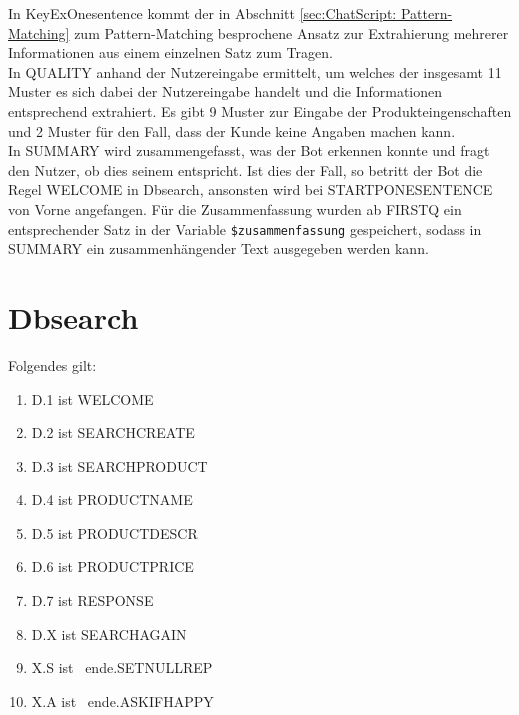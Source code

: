 In KeyExOnesentence kommt der in Abschnitt \ref{sec:ChatScript: Pattern-Matching} zum Pattern-Matching besprochene Ansatz zur Extrahierung mehrerer Informationen aus einem einzelnen Satz zum Tragen.\\
In QUALITY anhand der Nutzereingabe ermittelt, um welches der insgesamt 11 Muster es sich dabei der Nutzereingabe handelt und die Informationen entsprechend extrahiert. Es gibt 9 Muster zur Eingabe der Produkteingenschaften und 2 Muster für den Fall, dass der Kunde keine Angaben machen kann.\\
In SUMMARY wird zusammengefasst, was der Bot erkennen konnte und fragt den Nutzer, ob dies seinem entspricht. Ist dies der Fall, so betritt der Bot die Regel WELCOME in Dbsearch, ansonsten wird bei STARTPONESENTENCE von Vorne angefangen. Für die Zusammenfassung wurden ab FIRSTQ ein entsprechender Satz in der Variable \lstinline|$zusammenfassung| gespeichert, sodass in SUMMARY ein zusammenhängender Text ausgegeben werden kann.

\begin{center}
\end{center}


\section{Dbsearch}
\label{sec:Dbsearch}

Folgendes gilt: 

\begin{enumerate}
\item{D.1 ist WELCOME}
\item{D.2 ist SEARCHCREATE}
\item{D.3 ist SEARCHPRODUCT}
\item{D.4 ist PRODUCTNAME}
\item{D.5 ist PRODUCTDESCR}
\item{D.6 ist PRODUCTPRICE}
\item{D.7 ist RESPONSE}
\item{D.X ist SEARCHAGAIN}
\item{X.S ist ~ende.SETNULLREP}
\item{X.A ist ~ende.ASKIFHAPPY}
\end{enumerate}

